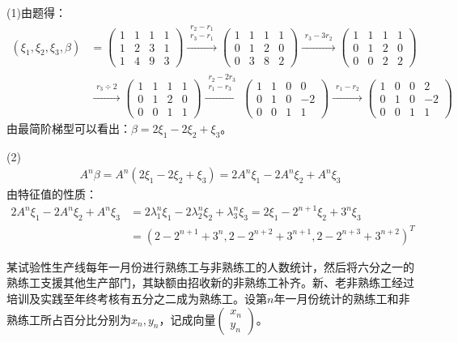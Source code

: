 \documentclass[a4paper]{report}
\begin{document}
\begin{jie}
(1)由题得：
\begin{align*}
(\xi_1,\xi_2,\xi_3,\beta)&=
\begin{pmatrix}
1&1&1&1\\
1&2&3&1\\
1&4&9&3
\end{pmatrix}\xrightarrow{\substack{r_2-r_1\\ r_{3}-r_1}}
{
\begin{pmatrix}
1&1&1&1\\
0&1&2&0\\
0&3&8&2
\end{pmatrix}
}\xrightarrow{\substack{r_{3}-3r_2}}
{
\begin{pmatrix}
1&1&1&1\\
0&1&2&0\\
0&0&2&2
\end{pmatrix}
}\\
&\xrightarrow{\substack{r_{3}\div 2}}
{
\begin{pmatrix}
1&1&1&1\\
0&1&2&0\\
0&0&1&1
\end{pmatrix}
}\xrightarrow{\substack{r_{2}-2r_3\\ r_1-r_3}}
{
\begin{pmatrix}
1&1&0&0\\
0&1&0&-2\\
0&0&1&1
\end{pmatrix}
}\xrightarrow{\substack{r_1-r_2}}
{
\begin{pmatrix}
1&0&0&2\\
0&1&0&-2\\
0&0&1&1
\end{pmatrix}
}
\end{align*}
由最简阶梯型可以看出：$\beta=2\xi_1-2\xi_2+\xi_3$。

(2)\begin{align*}
   A^n\beta=A^{n}(2\xi_1-2\xi_2+\xi_3)=2A^n\xi_1-2A^n\xi_2+A^n\xi_3
   \end{align*}
   由特征值的性质：
\begin{align*}
2A^n\xi_1-2A^n\xi_2+A^n\xi_3&=2\lambda_{1}^n\xi_1-2\lambda_{2}^n\xi_2+\lambda_{3}^n\xi_3=2\xi_1-2^{n+1}\xi_2+3^n\xi_3\\
&=(2-2^{n+1}+3^n,2-2^{n+2}+3^{n+1},2-2^{n+3}+3^{n+2})^T
\end{align*}
\end{jie}

\EX 某试验性生产线每年一月份进行熟练工与非熟练工的人数统计，然后将六分之一的熟练工支援其他生产部门，其缺额由招收新的非熟练工补齐。新、老非熟练工经过培训及实践至年终考核有五分之二成为熟练工。设第$n$年一月份统计的熟练工和非熟练工所占百分比分别为$x_n,y_n$，记成向量$
\begin{pmatrix}
x_n\\ y_n
\end{pmatrix}
$。
\end{document}
